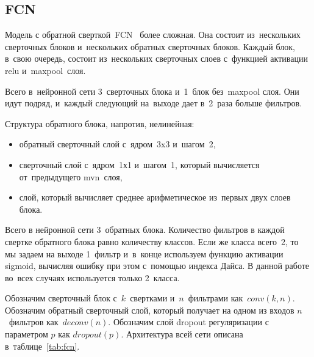 \subsection{FCN}
 
Модель с обратной сверткой~FCN~\cite{fcn} более сложная. Она состоит из~нескольких сверточных блоков и~нескольких обратных сверточных блоков. Каждый блок, в~свою очередь, состоит из~нескольких сверточных слоев с~функцией активации relu и~maxpool~слоя. 

Всего в~нейронной сети 3~сверточных блока и~1~блок без~maxpool слоя. Они идут подряд, и~каждый следующий на~выходе дает в~2~раза больше фильтров. 

Структура обратного блока, напротив, нелинейная:

\begin{itemize}
  \item обратный сверточный слой с~ядром~3x3 и~шагом~2,
  \item сверточный слой с~ядром~1х1 и~шагом~1, который вычисляется от~предыдущего mvn~слоя,
  \item слой, который вычисляет среднее арифметическое из~первых двух слоев блока.
\end{itemize}

Всего в нейронной сети 3~обратных блока. Количество фильтров в каждой свертке обратного блока равно количеству классов. Если же класса всего~2, то мы задаем на выходе 1~фильтр и~в~конце используем функцию активации sigmoid, вычисляя ошибку при этом с~помощью индекса Дайса. В данной работе во~всех случаях используется только 2~класса.

Обозначим сверточный блок с~$k$~свертками и~$n$~фильтрами как~$conv(k,n)$. Обозначим обратный сверточный слой, который получает на одном из входов $n$~фильтров как~$deconv(n)$. Обозначим слой dropout регуляризации с параметром $p$ как $dropout(p)$. Архитектура всей сети описана в~таблице~\ref{tab:fcn}.


